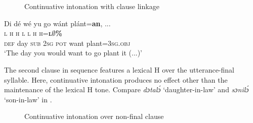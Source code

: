 \begin{figure}
\caption{Continuative intonation with clause linkage} 
\label{fig:key:3.40}
\end{figure}

\ea%
    \label{ex:key:93}
    \glll   Di  dé  wé  yu  go  wánt  plánt=\textbf{an},  \op...\cp\\
\textsc{l}  \textsc{h}  \textsc{h}  \textsc{l}  \textsc{l}  \textsc{h}    \textsc{h=\textbf{l}}\textbf{\textsc{${\emptyset}$}}\textbf{\textsc{\%}}\\
\textsc{def}  day  \textsc{sub}  \textsc{2sg}  \textsc{pot}  want  plant=\textsc{3sg.obj}\\
\glt ‘The day you would want to go plant it (...)’
\z

The second clause in sequence features a lexical H over the utterance-final syllable. Here, continuative intonation produces no effect other than the maintenance of the lexical H tone. Compare \textit{dɔtalɔ́} ‘daughter-in-law’ and \textit{sɔnilɔ́} ‘son-in-law’ in .

\begin{figure}
\caption{Continuative intonation over non-final clause}
\label{fig:key:3.41}
\end{figure}

